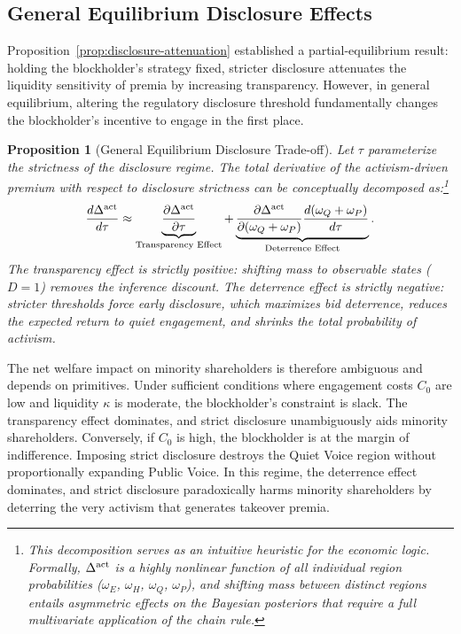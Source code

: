 \documentclass[11pt]{article}
\newtheorem{proposition}{Proposition}
\newcommand{\1}{\mathbf{1}}
\begin{document}
%
\subsection{General Equilibrium Disclosure Effects}
\label{sec:ge_disclosure}
%

Proposition~\ref{prop:disclosure-attenuation} established a partial-equilibrium result: holding the blockholder's strategy fixed, stricter disclosure attenuates the liquidity sensitivity of premia by increasing transparency. However, in general equilibrium, altering the regulatory disclosure threshold fundamentally changes the blockholder's incentive to engage in the first place.

\begin{proposition}[General Equilibrium Disclosure Trade-off]
\label{prop:ge-disclosure}
Let $\tau$ parameterize the strictness of the disclosure regime. The total derivative of the activism-driven premium with respect to disclosure strictness can be conceptually decomposed as:\footnote{This decomposition serves as an intuitive heuristic for the economic logic. Formally, $\Delta^{\textup{act}}$ is a highly nonlinear function of all individual region probabilities ($\omega_E$, $\omega_H$, $\omega_Q$, $\omega_P$), and shifting mass between distinct regions entails asymmetric effects on the Bayesian posteriors that require a full multivariate application of the chain rule.}
\begin{equation}
\frac{d \Delta^{\textup{act}}}{d \tau} \approx \underbrace{\frac{\partial \Delta^{\textup{act}}}{\partial \tau}}_{\text{Transparency Effect}} + \underbrace{\frac{\partial \Delta^{\textup{act}}}{\partial (\omega_Q + \omega_P)} \frac{d (\omega_Q + \omega_P)}{d \tau}}_{\text{Deterrence Effect}}.
\end{equation}
The transparency effect is strictly positive: shifting mass to observable states ($D=1$) removes the inference discount. The deterrence effect is strictly negative: stricter thresholds force early disclosure, which maximizes bid deterrence, reduces the expected return to quiet engagement, and shrinks the total probability of activism.
\end{proposition}

The net welfare impact on minority shareholders is therefore ambiguous and depends on primitives. Under sufficient conditions where engagement costs $C_0$ are low and liquidity $\kappa$ is moderate, the blockholder's constraint is slack. The transparency effect dominates, and strict disclosure unambiguously aids minority shareholders. Conversely, if $C_0$ is high, the blockholder is at the margin of indifference. Imposing strict disclosure destroys the Quiet Voice region without proportionally expanding Public Voice. In this regime, the deterrence effect dominates, and strict disclosure paradoxically harms minority shareholders by deterring the very activism that generates takeover premia.
\end{document}
